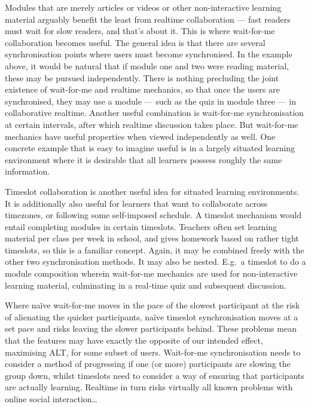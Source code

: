 Modules that are merely articles or videos or other non-interactive learning 
material arguably benefit the least from realtime collaboration --- fast 
readers must wait for slow readers, and that's about it. This is where 
wait-for-me collaboration becomes useful. The general idea is that there are 
several synchronisation points where users must become synchronised. In the 
example above, it would be natural that if module one and two were reading 
material, these may be pursued independently. There is nothing precluding the 
joint existence of wait-for-me and realtime mechanics, so that once the users 
are synchronised, they may use a module --- such as the quiz in module three 
--- in collaborative realtime. Another useful combination is wait-for-me 
synchronisation at certain intervals, after which realtime discussion takes 
place. But wait-for-me mechanics have useful properties when viewed 
independently as well. One concrete example that is easy to imagine useful is 
in a largely situated learning environment where it is desirable that all 
learners possess roughly the same information.

Timeslot collaboration is another useful idea for situated learning 
environments. It is additionally also useful for learners that want to 
collaborate across timezones, or following some self-imposed schedule. A 
timeslot mechanism would entail completing modules in certain timeslots. 
Teachers often set learning material per class per week in school, and gives 
homework based on rather tight timeslots, so this is a familiar concept. 
Again, it may be combined freely with the other two synchronisation methods. 
It may also be nested. E.g.\ a timeslot to do a module composition wherein 
wait-for-me mechanics are used for non-interactive learning material, 
culminating in a real-time quiz and subsequent discussion.

Where naïve wait-for-me moves in the pace of the slowest participant at the 
risk of alienating the quicker participants, naïve timeslot synchronisation 
moves at a set pace and risks leaving the slower participants behind. These 
problems mean that the features may have exactly the opposite of our intended 
effect, maximising ALT, for some subset of users. Wait-for-me synchronisation 
needs to consider a method of progressing if one (or more) participants are 
slowing the group down, whilst timeslots need to consider a way of ensuring 
that participants are actually learning. Realtime in turn risks virtually all 
known problems with online social interaction\ldots

